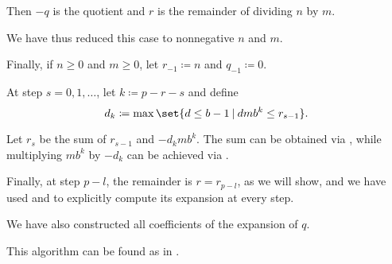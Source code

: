 \begin{algorithm}
\begin{thmenum}
    Then \( -q \) is the quotient and \( r \) is the remainder of dividing \( n \) by \( m \).

    We have thus reduced this case to nonnegative \( n \) and \( m \).

     Finally, if \( n \geq 0 \) and \( m \geq 0 \), let \( r_{-1} \coloneqq n \) and \( q_{-1} \coloneqq 0 \).

     At step \( s = 0, 1, \ldots \), let \( k \coloneqq p - r - s \) and define
    \begin{equation*}
      d_k \coloneqq \max\set{ d \leq b - 1 \given d m b^k \leq r_{s - 1} }.
    \end{equation*}

    Let \( r_s \) be the sum of \( r_{s - 1} \) and \( -d_k m b^k \). The sum can be obtained via , while multiplying \( m b^k \) by \( -d_k \) can be achieved via .

     Finally, at step \( p - l \), the remainder is \( r = r_{p - l} \), as we will show, and we have used  and  to explicitly compute its expansion at every step.

    We have also constructed all coefficients of the expansion of \( q \).
  \end{thmenum}
\end{algorithm}
\begin{comments}
  \item This algorithm can be found as  in \cite{notebook:code}.
\end{comments}
